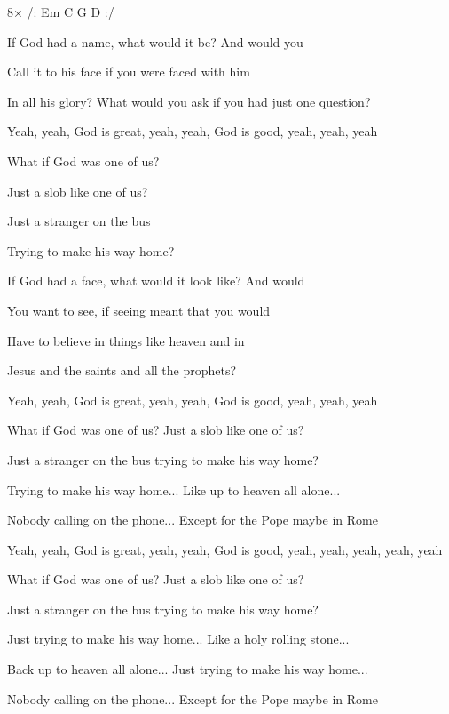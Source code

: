 

8× /: Em C G D :/

\zs
If God had a name, what would it be? And would you

Call it to his face if you were faced with him

In all his glory? What would you ask if you had just one question?

Yeah, yeah, God is great, yeah, yeah, God is good, yeah, yeah, yeah
\ks

\zr
What if God was one of us?

Just a slob like one of us?

Just a stranger on the bus

Trying to make his way home?
\kr

\zs
If God had a face, what would it look like? And would

You want to see, if seeing meant that you would

Have to believe in things like heaven and in 

Jesus and the saints and all the prophets?

Yeah, yeah, God is great, yeah, yeah, God is good, yeah, yeah, yeah
\ks

\zr
What if God was one of us?  Just a slob like one of us?

Just a stranger on the bus trying to make his way home?

Trying to make his way home...  Like up to heaven all alone...

Nobody calling on the phone...  Except for the Pope maybe in Rome

Yeah, yeah, God is great, yeah, yeah, God is good, yeah, yeah, yeah, yeah, yeah
\kr

\zr
What if God was one of us?  Just a slob like one of us?

Just a stranger on the bus trying to make his way home?

Just trying to make his way home...
Like a holy rolling stone...

Back up to heaven all alone...
Just trying to make his way home...

Nobody calling on the phone...
Except for the Pope maybe in Rome
\kr

\kp
